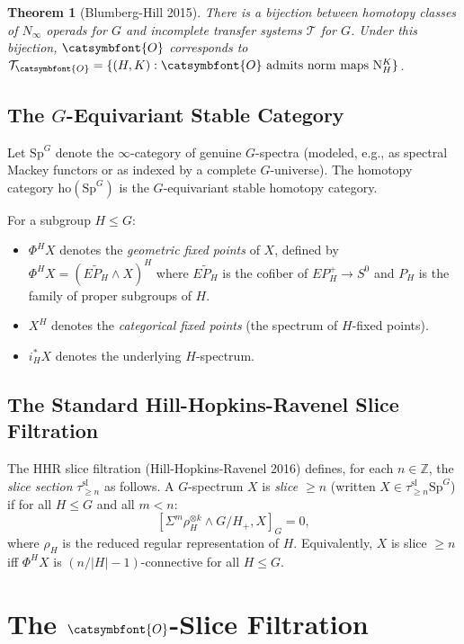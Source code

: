 \documentclass[12pt]{article}
\newtheorem{theorem}{Theorem}
\theoremstyle{definition}
\newcommand{\aO}{{\catsymbfont{O}}}
\begin{document}
\begin{theorem}[Blumberg-Hill 2015]\label{thm:BH}
There is a bijection between homotopy classes of $N_\infty$ operads for $G$ and incomplete transfer systems $\mathcal{T}$ for $G$. Under this bijection, $\aO$ corresponds to $\mathcal{T}_\aO = \{(H,K) : \aO\text{ admits norm maps }\mathrm{N}_H^K\}$.
\end{theorem}

\subsection{The $G$-Equivariant Stable Category}

Let $\mathrm{Sp}^G$ denote the $\infty$-category of genuine $G$-spectra (modeled, e.g., as spectral Mackey functors or as indexed by a complete $G$-universe). The homotopy category $\mathrm{ho}(\mathrm{Sp}^G)$ is the $G$-equivariant stable homotopy category.

For a subgroup $H\leq G$:
\begin{itemize}
\item $\Phi^H X$ denotes the \emph{geometric fixed points} of $X$, defined by $\Phi^H X = (E\tilde{P}_H\wedge X)^H$ where $E\tilde{P}_H$ is the cofiber of $EP_H^+ \to S^0$ and $P_H$ is the family of proper subgroups of $H$.
\item $X^H$ denotes the \emph{categorical fixed points} (the spectrum of $H$-fixed points).
\item $i_H^* X$ denotes the underlying $H$-spectrum.
\end{itemize}

\subsection{The Standard Hill-Hopkins-Ravenel Slice Filtration}

The HHR slice filtration (Hill-Hopkins-Ravenel 2016) defines, for each $n\in\mathbb{Z}$, the \emph{slice section} $\tau_{\geq n}^{\mathrm{sl}}$ as follows. A $G$-spectrum $X$ is \emph{slice $\geq n$} (written $X\in\tau_{\geq n}^{\mathrm{sl}}\mathrm{Sp}^G$) if for all $H\leq G$ and all $m < n$:
$$[\Sigma^m\rho_H^{\otimes k}\wedge G/H_+, X]_G = 0,$$
where $\rho_H$ is the reduced regular representation of $H$. Equivalently, $X$ is slice $\geq n$ iff $\Phi^H X$ is $(n/|H|-1)$-connective for all $H\leq G$.

\section{The $\aO$-Slice Filtration}
\end{document}
